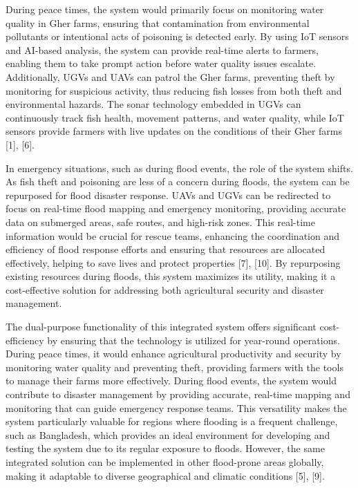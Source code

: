 \documentclass[conference]{IEEEtran}
\begin{document}
During peace times, the system would primarily focus on monitoring water quality in Gher farms, ensuring that contamination from environmental pollutants or intentional acts of poisoning is detected early. By using IoT sensors and AI-based analysis, the system can provide real-time alerts to farmers, enabling them to take prompt action before water quality issues escalate. Additionally, UGVs and UAVs can patrol the Gher farms, preventing theft by monitoring for suspicious activity, thus reducing fish losses from both theft and environmental hazards. The sonar technology embedded in UGVs can continuously track fish health, movement patterns, and water quality, while IoT sensors provide farmers with live updates on the conditions of their Gher farms [1], [6].


In emergency situations, such as during flood events, the role of the system shifts. As fish theft and poisoning are less of a concern during floods, the system can be repurposed for flood disaster response. UAVs and UGVs can be redirected to focus on real-time flood mapping and emergency monitoring, providing accurate data on submerged areas, safe routes, and high-risk zones. This real-time information would be crucial for rescue teams, enhancing the coordination and efficiency of flood response efforts and ensuring that resources are allocated effectively, helping to save lives and protect properties [7], [10]. By repurposing existing resources during floods, this system maximizes its utility, making it a cost-effective solution for addressing both agricultural security and disaster management.


The dual-purpose functionality of this integrated system offers significant cost-efficiency by ensuring that the technology is utilized for year-round operations. During peace times, it would enhance agricultural productivity and security by monitoring water quality and preventing theft, providing farmers with the tools to manage their farms more effectively. During flood events, the system would contribute to disaster management by providing accurate, real-time mapping and monitoring that can guide emergency response teams. This versatility makes the system particularly valuable for regions where flooding is a frequent challenge, such as Bangladesh, which provides an ideal environment for developing and testing the system due to its regular exposure to floods. However, the same integrated solution can be implemented in other flood-prone areas globally, making it adaptable to diverse geographical and climatic conditions [5], [9].
\end{document}

